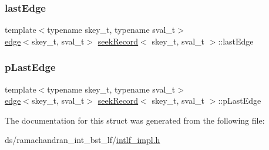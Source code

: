 \subsubsection{\texorpdfstring{last\+Edge}{lastEdge}}
{\footnotesize\ttfamily template$<$typename skey\+\_\+t, typename sval\+\_\+t$>$ \\
\hyperlink{structedge}{edge}$<$skey\+\_\+t, sval\+\_\+t$>$ \hyperlink{structseekRecord}{seek\+Record}$<$ skey\+\_\+t, sval\+\_\+t $>$\+::last\+Edge}

\mbox{\label{structseekRecord_a67108aa1c693e09220663af93803f591}} 
\subsubsection{\texorpdfstring{p\+Last\+Edge}{pLastEdge}}
{\footnotesize\ttfamily template$<$typename skey\+\_\+t, typename sval\+\_\+t$>$ \\
\hyperlink{structedge}{edge}$<$skey\+\_\+t, sval\+\_\+t$>$ \hyperlink{structseekRecord}{seek\+Record}$<$ skey\+\_\+t, sval\+\_\+t $>$\+::p\+Last\+Edge}



The documentation for this struct was generated from the following file\+:\begin{DoxyCompactItemize}
\item 
ds/ramachandran\+\_\+int\+\_\+bst\+\_\+lf/\hyperlink{intlf__impl_8h}{intlf\+\_\+impl.\+h}\end{DoxyCompactItemize}
